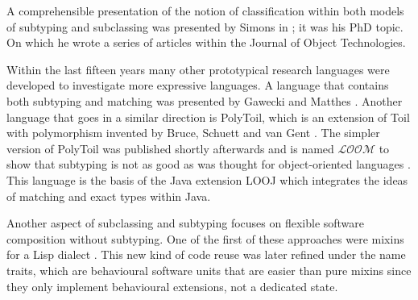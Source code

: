 A comprehensible presentation of the notion of classification within
both models of subtyping and subclassing was presented by Simons in
\cite{simons_theory_2002-2}; it was his PhD topic. On which he wrote a series of
articles within the Journal of Object Technologies.

Within the last fifteen years many other prototypical research
languages were developed to investigate more expressive languages. A
language that contains both subtyping and matching was presented
by Gawecki and Matthes \cite{gawecki_tool:_1995}. Another language
that goes in a similar direction is PolyToil, which is an extension
of Toil with polymorphism invented by Bruce, Schuett and van Gent
\cite{bruce_polytoil:_1995}. The simpler version of PolyToil was
published shortly afterwards and is named $\mathcal{LOOM}$ to show
that subtyping is not as good as was thought for object-oriented languages
\cite{bruce_subtyping_1997}. This language is the basis of the Java
extension LOOJ which integrates the ideas of matching and exact types
within Java.

Another aspect of subclassing and subtyping focuses
on flexible software composition without subtyping. One
of the first of these approaches were mixins for a Lisp dialect
\cite{bracha_mixin-based_1990}. This new kind of code reuse
was later refined under the name traits, which are behavioural software
units \cite{schaerli_traits:_2003,ducasse_traits:_2006} that are easier
than pure mixins since they only implement behavioural extensions,
not a dedicated state.

